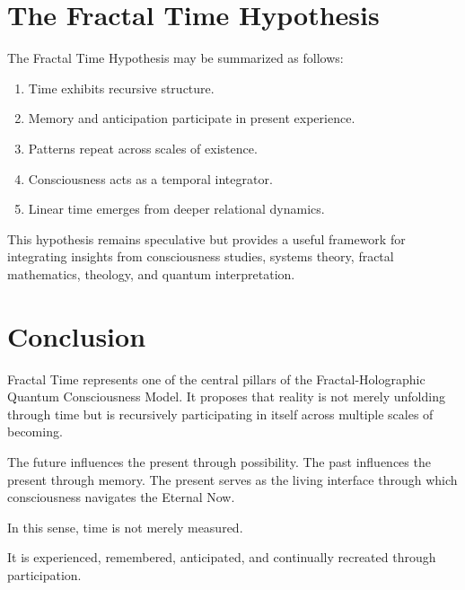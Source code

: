 \section{The Fractal Time Hypothesis}

The Fractal Time Hypothesis may be summarized as follows:

\begin{enumerate}
\item Time exhibits recursive structure.
\item Memory and anticipation participate in present experience.
\item Patterns repeat across scales of existence.
\item Consciousness acts as a temporal integrator.
\item Linear time emerges from deeper relational dynamics.
\end{enumerate}

This hypothesis remains speculative but provides a useful framework for integrating insights from consciousness studies, systems theory, fractal mathematics, theology, and quantum interpretation.

\section{Conclusion}

Fractal Time represents one of the central pillars of the Fractal-Holographic Quantum Consciousness Model. It proposes that reality is not merely unfolding through time but is recursively participating in itself across multiple scales of becoming.

The future influences the present through possibility. The past influences the present through memory. The present serves as the living interface through which consciousness navigates the Eternal Now.

In this sense, time is not merely measured.

It is experienced, remembered, anticipated, and continually recreated through participation.

